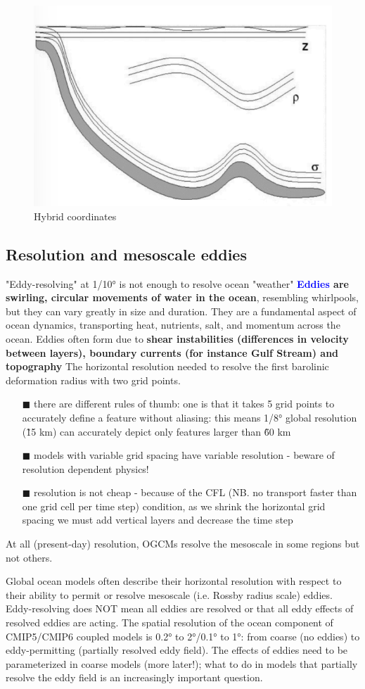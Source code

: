 \begin{figure}[htp!]
	\centering
	\includegraphics[width=0.5\linewidth]{uploads/Screenshot 2024-11-22 000943.png}
	\caption{Hybrid coordinates}
	\label{fig:enter-label}
\end{figure}
\subsection{Resolution and mesoscale eddies}
"Eddy-resolving" at 1/10° is not enough to resolve ocean "weather"
\textbf{\textcolor{Blue}{Eddies} are swirling, circular movements of water in the ocean}, resembling whirlpools, but they can vary greatly in size and duration. They are a fundamental aspect of ocean dynamics, transporting heat, nutrients, salt, and momentum across the ocean. Eddies often form due to \textbf{shear instabilities (differences in velocity between layers), boundary currents (for instance Gulf Stream) and topography}
The horizontal resolution needed to resolve the first barolinic deformation radius with two grid points.
\begin{itemize}
	\item[$\blacksquare$] there are different rules of thumb: one is that it takes 5 grid points to accurately define a feature without aliasing: this means 1/8° global resolution (\~15 km) can accurately depict only features larger than \~60 km
	\item[$\blacksquare$] models with variable grid spacing have variable resolution - beware of resolution dependent physics!
	\item[$\blacksquare$] resolution is not cheap - because of the CFL (NB. no transport faster than one grid cell per time step) condition, as we shrink the horizontal grid spacing we must add vertical layers and decrease the time step
\end{itemize}
At all (present-day) resolution, OGCMs resolve the mesoscale in some regions but not others.

Global ocean models often describe their horizontal resolution with respect to their ability to permit or resolve mesoscale (i.e. Rossby radius scale) eddies.
Eddy-resolving does NOT mean all eddies are resolved or that all eddy effects of resolved eddies are acting. The spatial resolution of the ocean component of CMIP5/CMIP6 coupled models is 0.2° to 2°/0.1° to 1°: from coarse (no eddies) to eddy-permitting (partially resolved eddy field). The effects of eddies need to be parameterized in coarse models (more later!); what to do in models that partially resolve the eddy field is an increasingly important question.

